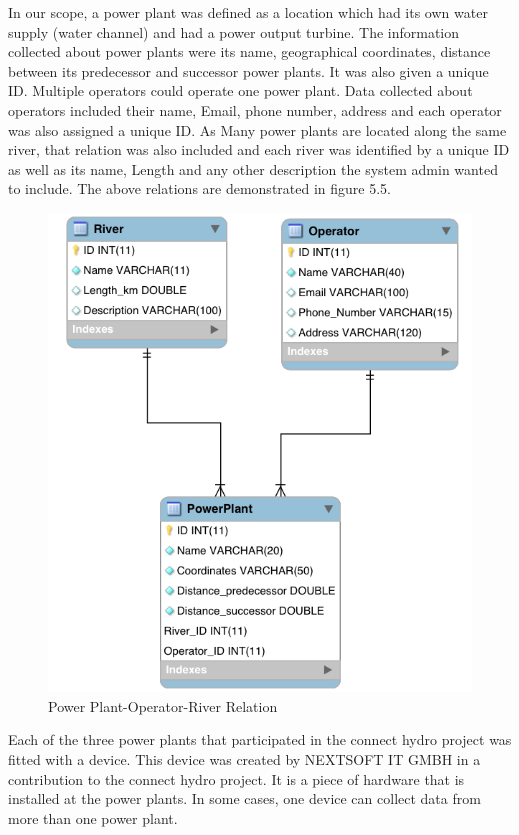 In our scope, a power plant was defined as a location which had its own water supply (water channel) and had a power output turbine. The information collected about power plants were its name, geographical coordinates, distance between its predecessor and successor power plants. It was also given a unique ID. Multiple operators could operate one power plant. Data collected about operators included their name, Email, phone number, address and each operator was also assigned a unique ID. As Many power plants are located along the same river, that relation was also included and each river was identified by a unique ID as well as its name, Length and any other description the system admin wanted to include. The above relations are demonstrated in figure 5.5.
\begin{figure}[H]
\centering
\includegraphics[scale=0.4]{Images/PP_River_Operator.png}
\caption[Power Plant-Operator-River Relation]{Power Plant-Operator-River Relation}
\end{figure}
Each of the three power plants that participated in the connect hydro project was fitted with a device. This device was created by NEXTSOFT IT GMBH in a contribution to the connect hydro project. It is a piece of hardware that is installed at the power plants. In some cases, one device can collect data from more than one power plant.
